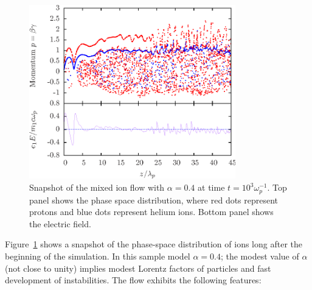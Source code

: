 
\begin{figure}[h]
\begin{center}
\includegraphics[width=0.8\textwidth]{pics/chap2/f7.eps}
\caption[Snapshot of mixed ion flow]{Snapshot of the mixed ion flow with
  $\alpha=0.4$ at time $t = 10^3\omega^{-1}_p$. Top panel shows the phase space
  distribution, where red dots represent protons and blue dots represent helium
  ions. Bottom panel shows the electric field. }
\label{fig:2stream}
\end{center}
\end{figure}

Figure~\ref{fig:2stream} shows a snapshot of the phase-space distribution of
ions long after the beginning of the simulation. In this sample model
$\alpha=0.4$; the modest value of $\alpha$ (not close to unity) implies modest
Lorentz factors of particles and fast development of instabilities.
%
The flow exhibits the following features:


